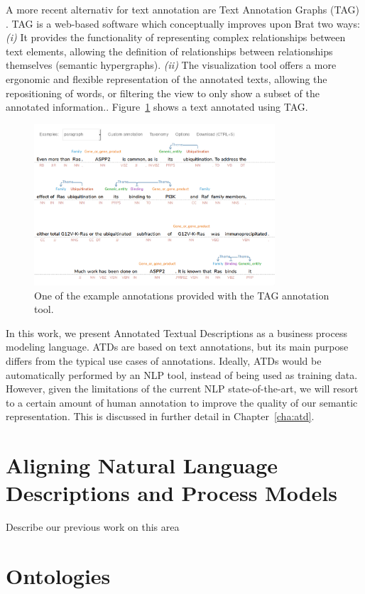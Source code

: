 A more recent alternativ for text annotation are Text Annotation Graphs (TAG)
\cite{DBLP:journals/corr/abs-1711-00529}. TAG is a web-based software which
conceptually improves upon Brat two ways: \textit{(i)} It provides the
functionality of representing complex relationships between text elements,
allowing the definition of relationships between relationships themselves
(semantic hypergraphs). \textit{(ii)} The visualization tool offers a more
ergonomic and flexible representation of the annotated texts, allowing the
repositioning of words, or filtering the view to only show a subset of the
annotated information.. Figure~\ref{fig:tag} shows
a text annotated using TAG.


\begin{figure}[htb]
  \centering
  \includegraphics[width=0.8\textwidth]{figures/tag}
  \caption{One of the example annotations provided with the TAG
    annotation tool.}
  \label{fig:tag}
\end{figure}

In this work, we present Annotated Textual Descriptions as a business process
modeling language. ATDs are based on text annotations, but its main purpose
differs from the typical use cases of annotations. Ideally, ATDs would be
automatically performed by an NLP tool, instead of being used as training data.
However, given the limitations of the current NLP state-of-the-art, we will
resort to a certain amount of human annotation to improve the quality of our
semantic representation. This is discussed in further detail in Chapter~\ref{cha:atd}.


\section{Aligning Natural Language Descriptions and Process Models}
\label{sec:background_alignments}

Describe our previous work on this area

\section{Ontologies}
\label{sec:background_ontologies}

